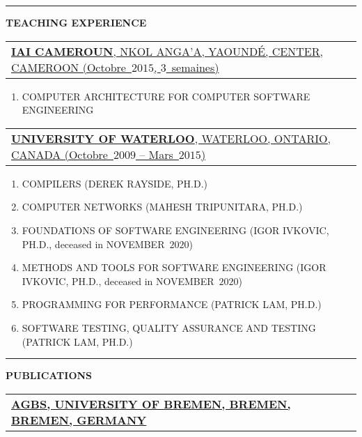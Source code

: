 \documentclass[9pt,a4paper]{article} %
\makeatletter
\newcommand{\headerrow}[2]
{\begin{tabular*}{\linewidth}{l@{\extracolsep{\fill}}r}
	#1 &
	#2 \\
\end{tabular*}}
\newcommand{\headerrowONE}[1]{\headerrow{#1}{}}
\makeatother
\begin{document}

\hrule
\begin{center}
{\large \textbf{TEACHING EXPERIENCE}}
\end{center}

\vspace{0.5em}

\headerrowONE{\href{http://iaicameroun.com}{\textbf{IAI CAMEROUN}, NKOL ANGA'A, YAOUNDÉ, CENTER, CAMEROON (Octobre~$2015$, $3$~semaines)}}
\begin{enumerate}
	\item COMPUTER ARCHITECTURE FOR COMPUTER SOFTWARE ENGINEERING
\end{enumerate}

\vspace{0.5em}

\headerrowONE{\href{http://ece.uwaterloo.ca}{\textbf{UNIVERSITY OF WATERLOO}, WATERLOO, ONTARIO, CANADA (Octobre~$2009$ -- Mars~$2015$)}}

\begin{enumerate}
	\itemsep -0.3em
	\item COMPILERS (DEREK RAYSIDE, PH.D.)
	\item COMPUTER NETWORKS (MAHESH TRIPUNITARA, PH.D.)
	\item FOUNDATIONS OF SOFTWARE ENGINEERING (IGOR IVKOVIC, PH.D., deceased in NOVEMBER~$2020$)
	\item METHODS AND TOOLS FOR SOFTWARE ENGINEERING (IGOR IVKOVIC, PH.D., deceased in NOVEMBER~$2020$)
	\item PROGRAMMING FOR PERFORMANCE (PATRICK LAM, PH.D.)
	\item SOFTWARE TESTING, QUALITY ASSURANCE AND TESTING (PATRICK LAM, PH.D.)
\end{enumerate}


\vspace{1em}

\hrule
\begin{center}
{\large \textbf{PUBLICATIONS}}
\end{center}

\vspace{0.5em}

\headerrowONE{\href{http://www.informatik.uni-bremen.de/agbs}{
	\textbf{AGBS, UNIVERSITY OF BREMEN, BREMEN, BREMEN, GERMANY}}}

\vspace{0.3em}
\end{document}
